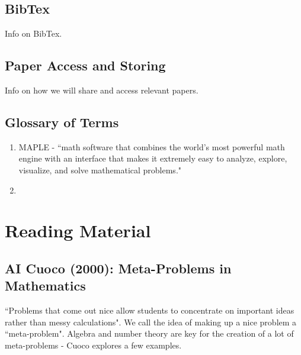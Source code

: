 \documentclass[12pt]{article}
\begin{document}
\subsection{BibTex}
Info on BibTex.

\subsection{Paper Access and Storing}
Info on how we will share and access relevant papers.

\subsection{Glossary of Terms}
\begin{enumerate}[itemsep=-2mm]
    \item MAPLE - ``math software that combines the world's most powerful math engine with an interface that makes it extremely easy to analyze, explore, visualize, and solve mathematical problems."
    \item 
\end{enumerate}

\pagebreak 

\section{Reading Material}

\subsection{AI Cuoco (2000): Meta-Problems in Mathematics}
``Problems that come out nice allow students to concentrate on important ideas rather than messy calculations". We call the idea of making up a nice problem a ``meta-problem". Algebra and number theory are key for the creation of a lot of meta-problems - Cuoco explores a few examples.
\end{document}
